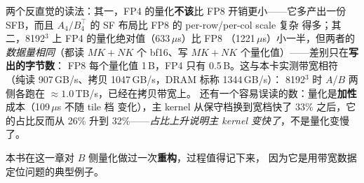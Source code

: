 两个反直觉的读法：其一，FP4 的量化\textbf{不该}比 FP8 开销更小——它多产出一份
SFB，而且 $A_4/B_4^{\top}$ 的 SF 布局比 FP8 的 per-row/per-col scale 复杂
得多；其二，8192$^3$ 上 FP4 的量化绝对值（633\,$\mu$s）比 FP8
（1221\,$\mu$s）小一半，但两者的\emph{数据量相同}（都读 $MK{+}NK$ 个
bf16、写 $MK{+}NK$ 个量化值）——差别只在\textbf{写出的字节数}：
FP8 每个量化值 1\,B，FP4 只有 0.5\,B。这与本卡实测带宽相符
（纯读 907\,GB/s、拷贝 1047\,GB/s，DRAM 标称 1344\,GB/s）：
8192$^3$ 时 $A$/$B$ 两侧各跑在 $\approx1.0$\,TB/s，已经在拷贝带宽上。
还有一个容易误读的数：量化是\textbf{加性}成本（109\,$\mu$s 不随 tile 档
变化），主 kernel 从保守档换到宽档快了 $33\%$ 之后，它的占比反而从
26\% 升到 32\%——\emph{占比上升说明主 kernel 变快了}，不是量化变慢了。

本书在这一章对 $B$ 侧量化做过一次\textbf{重构}，过程值得记下来，
因为它是用带宽数据定位问题的典型例子。

